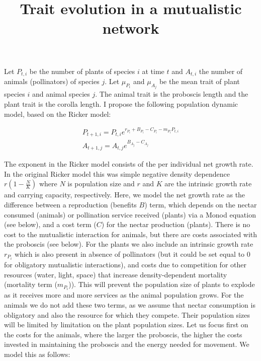 \documentclass[a4paper,12pt]{article}
\title{Trait evolution in a mutualistic network}
\begin{document}
\maketitle

Let $P_{t,i}$ be the number of plants of species $i$ at time $t$ and $A_{t,i}$ the number of animals (pollinators) of species $j$. Let $\mu_{P_i}$ and $\mu_{A_j}$ be the mean trait of plant species $i$ and animal species $j$. The animal trait is the proboscis length and the plant trait is the corolla length. I propose the following population dynamic model, based on the Ricker model: 

\begin{align}
    P_{t+1,i} = P_{t,i} e^{r_{P_i} + B_{P_i} - C_{P_i} - m_{P_i} P_{t,i}} \label{pop_dyn_P}\\
    A_{t+1,j} = A_{t,j} e^{B_{A_j} - C_{A_j}  \label{pop_dyn_A}}
\end{align}

The exponent in the Ricker model consists of the per individual net growth rate. In the original Ricker model this was simple negative density dependence $r(1 - \frac{N}{K})$ where $N$ is population size and $r$ and $K$ are the intrinsic growth rate and carrying capacity, respectively. Here, we model the net growth rate as the difference between a reproduction (benefits $B$) term, which depends on the nectar consumed (animals) or pollination service received (plants) via a Monod equation (see below), and a cost term ($C$) for the nectar production (plants). There is no cost to the mutualistic interaction for animals, but there are costs associated with the proboscis (see below). For the plants we also include an intrinsic growth rate $r_{P_i}$ which is also present in absence of pollinators (but it could be set equal to 0 for obligatory mutualistic interactions), and costs due to competition for other resources (water, light, space) that increase density-dependent mortality (mortality term ($m_{P_i}$)). This will prevent the population size of plants to explode as it receives more and more services as the animal population grows. For the animals we do not add these two terms, as we assume that nectar consumption is obligatory and also the resource for which they compete. Their population sizes will be limited by limitation on the plant population sizes. Let us focus first on the costs for the animals, where the larger the proboscis, the higher the costs invested in maintaining the proboscis and the energy needed for movement. We model this as follows:
\end{document}
